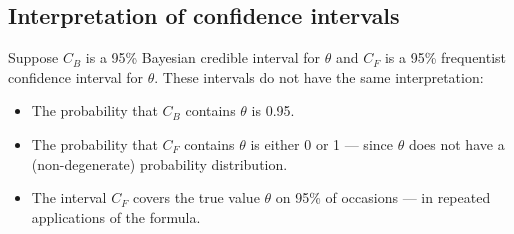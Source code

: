 \subsection*{Interpretation of confidence intervals}
Suppose $C_B$ is a 95\% Bayesian credible interval for $\theta$
and $C_F$ is a 95\% frequentist confidence interval for
$\theta$. These intervals do not have the same interpretation:
\begin{itemize}
\item The probability that $C_B$ contains $\theta$ is 0.95.
\item The probability that $C_F$ contains $\theta$ is either 0 or 1
--- since $\theta$ does not have a (non-degenerate) probability
distribution.
\item The interval $C_F$ covers the true value $\theta$ on 95\% of
occasions --- in repeated applications of the formula.
\end{itemize}

